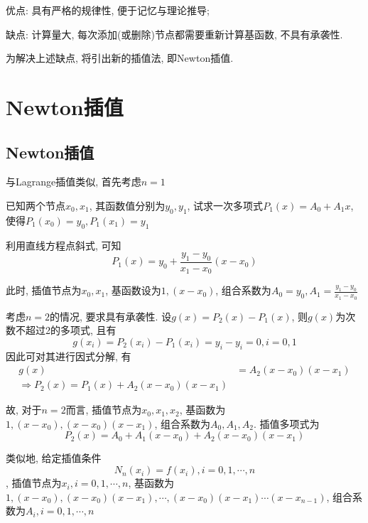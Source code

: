 优点: 具有严格的规律性, 便于记忆与理论推导;

缺点: 计算量大, 每次添加(或删除)节点都需要重新计算基函数, 不具有承袭性.

为解决上述缺点, 将引出新的插值法, 即Newton插值.

\section{Newton插值}

\subsection{Newton插值}

与Lagrange插值类似, 首先考虑$n=1$

\begin{example}
    已知两个节点$x_0,x_1$, 其函数值分别为$y_0,y_1$, 试求一次多项式$P_1(x)=A_0+A_1x$, 使得$P_1(x_0)=y_0, P_1(x_1)=y_1$
\end{example}

\begin{solution}
    利用直线方程点斜式, 可知
    \begin{equation*}
        P_1(x)=y_0+\frac{y_1-y_0}{x_1-x_0}(x-x_0)
    \end{equation*}

    此时, 插值节点为$x_0,x_1$, 基函数设为$1,(x-x_0)$, 组合系数为$A_0=y_0, A_1=\frac{y_1-y_0}{x_1-x_0}$
\end{solution}

考虑$n=2$的情况, 要求具有承袭性. 设$g(x)=P_2(x)-P_1(x)$, 则$g(x)$为次数不超过2的多项式, 且有
\begin{equation*}
    g(x_i)=P_2(x_i)-P_1(x_i)=y_i-y_i=0, i=0,1
\end{equation*}
因此可对其进行因式分解, 有
\begin{align*}
    g(x)&=A_2(x-x_0)(x-x_1)\\
    \Rightarrow  P_2(x)=P_1(x)+A_2(x-x_0)(x-x_1)
\end{align*}

故, 对于$n=2$而言, 插值节点为$x_0,x_1,x_2$, 基函数为$1,(x-x_0),(x-x_0)(x-x_1)$, 组合系数为$A_0,A_1,A_2$. 插值多项式为
\begin{equation*}
    P_2(x)=A_0+A_1(x-x_0)+A_2(x-x_0)(x-x_1)
\end{equation*}

类似地, 给定插值条件
\begin{equation*}
    N_n(x_i)=f(x_i), i=0,1,\cdots,n
\end{equation*}
, 插值节点为$x_i, i=0,1,\cdots,n$, 基函数为$1,(x-x_0),(x-x_0)(x-x_1),\cdots,(x-x_0)(x-x_1)\cdots(x-x_{n-1})$, 组合系数为$A_i,i=0,1,\cdots,n$

